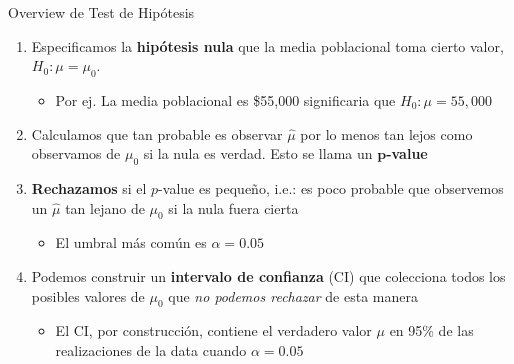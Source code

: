 \documentclass[11pt,handout,aspectratio=169]{beamer}
\begin{document}
\begin{frame}{Overview de Test de Hipótesis}

\begin{enumerate}
	\item 
	Especificamos la \textbf{hipótesis nula} que la media poblacional toma cierto valor, $H_0: \mu = \mu_0$.
\smallskip
		\begin{itemize}
			\item 
			Por ej. La media poblacional es \$55,000 significaria que $H_0: \mu = 55,000$
			\end{itemize}
	
	\medskip
	\pause
	\item
	Calculamos que tan probable es observar $\hat\mu$ por lo menos tan lejos como observamos de $\mu_0$ si la nula es verdad. Esto se llama un \textbf{$\mathbf{p}$-value}
	\medskip
	\pause
	\item
	\textbf{Rechazamos} si el $p$-value es pequeño, i.e.: es poco probable que observemos un $\hat\mu$ tan lejano de $\mu_0$ si la nula fuera cierta
\smallskip
		\begin{itemize}
		\pause 
		\item
		El umbral más común es $\alpha=0.05$ 
	\end{itemize}
	
	\vspace{.1cm}
	\pause
	\item
	
	Podemos construir un \textbf{intervalo de confianza} (CI) que colecciona todos los posibles valores de $\mu_0$ que \textit{no podemos rechazar} de esta manera
		\begin{itemize}
			\pause
			\item
			El CI, por construcción, contiene el verdadero valor $\mu$ en 95\% de las realizaciones de la data cuando $\alpha = 0.05$ 
		\end{itemize}
\end{enumerate}
	
\end{frame}
\end{document}

